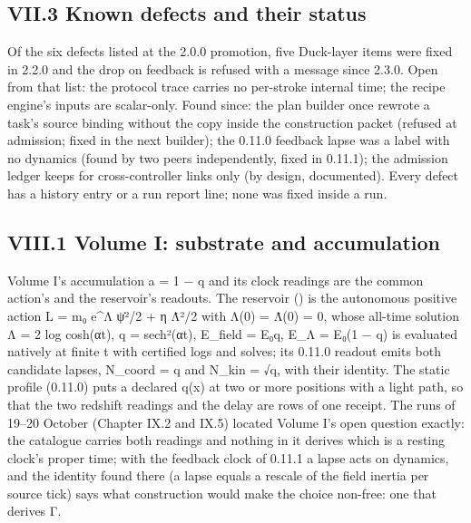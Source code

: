 \subsection{VII.3 Known defects and their status}\label{vii.3-known-defects-and-their-status}

Of the six defects listed at the 2.0.0 promotion, five Duck-layer items were fixed in 2.2.0 and the  drop on feedback is
refused with a message since 2.3.0. Open from that list: the protocol trace carries no per-stroke internal time; the recipe engine's inputs
are scalar-only. Found since: the plan builder once rewrote a task's source binding without the copy inside the construction packet
(refused at admission; fixed in the next builder); the 0.11.0 feedback lapse was a label with no dynamics (found by two peers independently,
fixed in 0.11.1); the admission ledger keeps  for cross-controller links only (by design, documented). Every defect has a history
entry or a run report line; none was fixed inside a run.

\label{connections-to-volumes-i-ii-and-iii}

\subsection{VIII.1 Volume I: substrate and accumulation}\label{viii.1-volume-i-substrate-and-accumulation}

Volume I's accumulation a = 1 − q and its clock readings are the common action's and the reservoir's readouts. The reservoir
() is the autonomous positive action L = m₀ e\^{}Λ ψ̇²/2 + η Λ̇²/2 with Λ(0) = Λ̇(0) = 0, whose all-time solution
Λ = 2 log cosh(αt), q = sech²(αt), E\_field = E₀q, E\_Λ = E₀(1 − q) is evaluated natively at finite t with certified logs and solves; its 0.11.0
readout emits both candidate lapses, N\_coord = q and N\_kin = √q, with their identity. The static profile (0.11.0) puts a declared q(x) at two
or more positions with a light path, so that the two redshift readings and the delay are rows of one receipt. The runs of 19--20 October
(Chapter IX.2 and IX.5) located Volume I's open question exactly: the catalogue carries both readings and nothing in it derives which is a
resting clock's proper time; with the feedback clock of 0.11.1 a lapse acts on dynamics, and the identity found there (a lapse equals a
rescale of the field inertia per source tick) says what construction would make the choice non-free: one that derives Γ.

